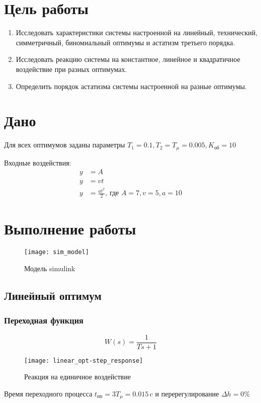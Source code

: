 


	
	\setcounter{page}{2}
	\section{Цель работы}
		\begin{enumerate}
			\item Исследовать характеристики системы настроенной на линейный, технический, симметричный, биномиальный оптимумы и астатизм третьего порядка.
			\item Исследовать реакцию системы на константное, линейное и квадратичное воздействие при разных оптимумах.
            \item Определить порядок астатизма системы настроенной на разные оптимумы.
		\end{enumerate}
	\section{Дано}
		Для всех оптимумов заданы параметры $T_1=0.1, T_2=T_{\mu}=0.005, K_{\text{об}}=10$

		Входные воздействия:
		\begin{align*}
			  y &= A\\
			  y &= vt\\
			  y &= \frac{at^2}{2}\mbox{, где } A = 7, v=5, a=10
		\end{align*}
	\section{Выполнение работы}
		\begin{figure}[H]
			\centering
			\texttt{[image: sim\_model]}
			\caption{Модель simulink}
		\end{figure}
		\newpage
		\subsection{Линейный оптимум}
			\subsubsection{Переходная функция}
				$$W(s)=\frac{1}{Ts+1}$$
				\begin{figure}[H]
					\centering
					\texttt{[image: linear\_opt-step\_response]}
					\caption{Реакция на единичное воздействие}
				\end{figure}
				Время переходного процесса $t_{\text{пп}}=3T_{\mu}=0.015\,c$ и перерегулирование $\Delta h=0\%$
